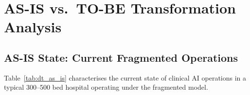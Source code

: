 
\section{AS-IS vs.\ TO-BE Transformation Analysis}
\label{sec:dt_as_is_to_be}

\subsection{AS-IS State: Current Fragmented Operations}

Table~\ref{tab:dt_as_is} characterises the current state of clinical AI operations in a typical 300--500 bed hospital operating under the fragmented model.
